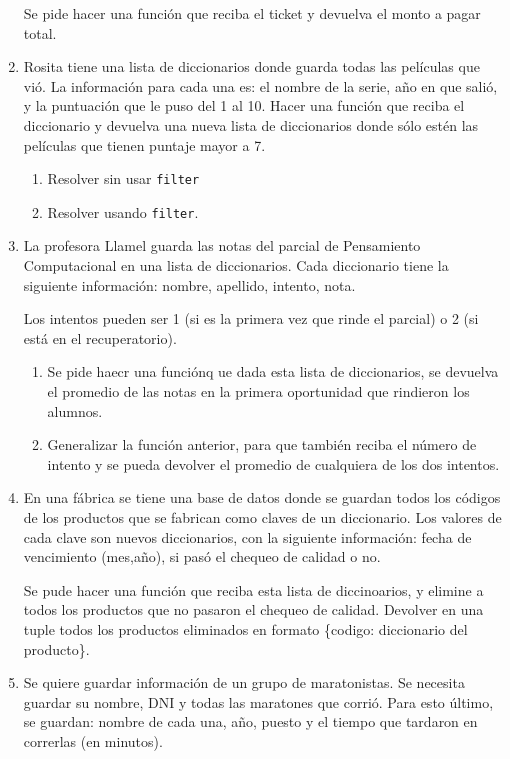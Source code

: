 \documentclass[
  letterpaper,
  DIV=11,
  numbers=noendperiod]{scrreprt}
\providecommand{\tightlist}{%
  \setlength{\itemsep}{0pt}\setlength{\parskip}{0pt}}\usepackage{longtable,booktabs,array}
\begin{document}
\begin{enumerate}
  Se pide hacer una función que reciba el ticket y devuelva el monto a
  pagar total.
\item
  Rosita tiene una lista de diccionarios donde guarda todas las
  películas que vió. La información para cada una es: el nombre de la
  serie, año en que salió, y la puntuación que le puso del 1 al 10.
  Hacer una función que reciba el diccionario y devuelva una nueva lista
  de diccionarios donde sólo estén las películas que tienen puntaje
  mayor a 7.

  \begin{enumerate}
  \def\labelenumii{\alph{enumii}.}
  \tightlist
  \item
    Resolver sin usar \texttt{filter}
  \item
    Resolver usando \texttt{filter}.
  \end{enumerate}
\item
  La profesora Llamel guarda las notas del parcial de Pensamiento
  Computacional en una lista de diccionarios. Cada diccionario tiene la
  siguiente información: nombre, apellido, intento, nota.

  Los intentos pueden ser 1 (si es la primera vez que rinde el parcial)
  o 2 (si está en el recuperatorio).

  \begin{enumerate}
  \def\labelenumii{\alph{enumii}.}
  \item
    Se pide haecr una funciónq ue dada esta lista de diccionarios, se
    devuelva el promedio de las notas en la primera oportunidad que
    rindieron los alumnos.
  \item
    Generalizar la función anterior, para que también reciba el número
    de intento y se pueda devolver el promedio de cualquiera de los dos
    intentos.
  \end{enumerate}
\item
  En una fábrica se tiene una base de datos donde se guardan todos los
  códigos de los productos que se fabrican como claves de un
  diccionario. Los valores de cada clave son nuevos diccionarios, con la
  siguiente información: fecha de vencimiento (mes,año), si pasó el
  chequeo de calidad o no.

  Se pude hacer una función que reciba esta lista de diccinoarios, y
  elimine a todos los productos que no pasaron el chequeo de calidad.
  Devolver en una tuple todos los productos eliminados en formato
  \{codigo: diccionario del producto\}.
\item
  Se quiere guardar información de un grupo de maratonistas. Se necesita
  guardar su nombre, DNI y todas las maratones que corrió. Para esto
  último, se guardan: nombre de cada una, año, puesto y el tiempo que
  tardaron en correrlas (en minutos).


\end{enumerate}
\end{document}
